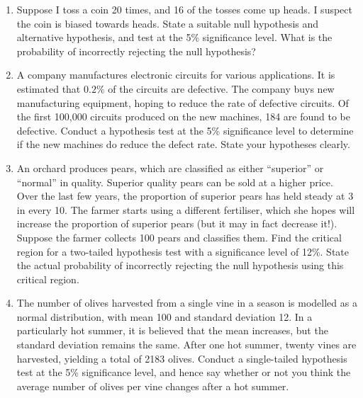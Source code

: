 \documentclass{article}
\begin{document}
\begin{enumerate}
	\item Suppose I toss a coin 20 times, and 16 of the tosses come up heads. I suspect the coin is biased towards heads. State a suitable null hypothesis and alternative hypothesis, and test at the 5\% significance level. What is the probability of incorrectly rejecting the null hypothesis?
	\item A company manufactures electronic circuits for various applications. It is estimated that $0.2\%$ of the circuits are defective. The company buys new manufacturing equipment, hoping to reduce the rate of defective circuits. Of the first 100,000 circuits produced on the new machines, 184 are found to be defective. Conduct a hypothesis test at the 5\% significance level to determine if the new machines do reduce the defect rate. State your hypotheses clearly.
	\item An orchard produces pears, which are classified as either ``superior'' or ``normal'' in quality. Superior quality pears can be sold at a higher price. Over the last few years, the proportion of superior pears has held steady at 3 in every 10. The farmer starts using a different fertiliser, which she hopes will increase the proportion of superior pears (but it may in fact decrease it!). Suppose the farmer collects 100 pears and classifies them. Find the critical region for a two-tailed hypothesis test with a significance level of 12\%. State the actual probability of incorrectly rejecting the null hypothesis using this critical region.
	\item The number of olives harvested from a single vine in a season is modelled as a normal distribution, with mean 100 and standard deviation 12. In a particularly hot summer, it is believed that the mean increases, but the standard deviation remains the same. After one hot summer, twenty vines are harvested, yielding a total of 2183 olives. Conduct a single-tailed hypothesis test at the 5\% significance level, and hence say whether or not you think the average number of olives per vine changes after a hot summer.
\end{enumerate}
\end{document}
